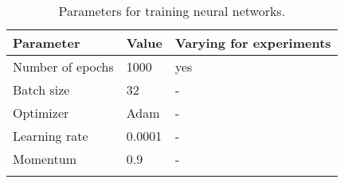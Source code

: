 \begin{table}[ht!]
\begin{center}
\caption{Parameters for training neural networks.}
\begin{tabular}{ M{6cm}  M{2cm} M{2cm}}
\toprule
\textbf{Parameter} & \textbf{Value} & \textbf{Varying for experiments} \\
\midrule
Number of epochs & 1000 & yes\\
Batch size & 32 & -\\
\midrule
Optimizer & Adam & -\\
Learning rate & 0.0001 & -\\
Momentum & 0.9 & -\\
\bottomrule
\label{tab:exp_details_params_train}
\end{tabular}
\end{center}
\vspace{-4mm}
\end{table}
\FloatBarrier
\noindent